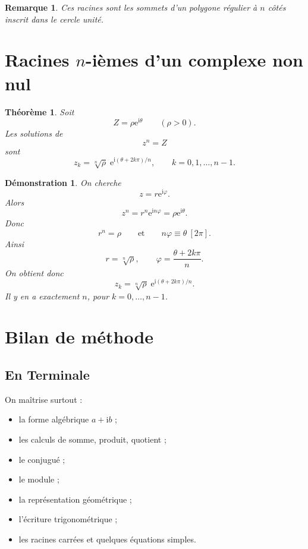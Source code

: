 \documentclass[11pt,a4paper]{article}
\newtheorem{theoreme}[definition]{Théorème}
\newtheorem{remarque}[definition]{Remarque}
\newtheorem*{demonstration}{Démonstration}
\newcommand{\ii}{\mathrm{i}}
\newcommand{\e}{\mathrm{e}}
\begin{document}
\begin{remarque}
Ces racines sont les sommets d'un polygone régulier à $n$ côtés inscrit dans le cercle unité.
\end{remarque}

\section{Racines $n$-ièmes d'un complexe non nul}

\begin{theoreme}
Soit
\[
Z=\rho \e^{\ii\theta}
\qquad (\rho>0).
\]
Les solutions de
\[
z^n=Z
\]
sont
\[
z_k=\sqrt[n]{\rho}\;\e^{\ii(\theta+2k\pi)/n},
\qquad k=0,1,\dots,n-1.
\]
\end{theoreme}

\begin{demonstration}
On cherche
\[
z=r\e^{\ii\varphi}.
\]
Alors
\[
z^n=r^n\e^{\ii n\varphi}=\rho \e^{\ii\theta}.
\]
Donc
\[
r^n=\rho
\qquad \text{et} \qquad
n\varphi\equiv \theta \ [2\pi].
\]
Ainsi
\[
r=\sqrt[n]{\rho},
\qquad
\varphi=\frac{\theta+2k\pi}{n}.
\]
On obtient donc
\[
z_k=\sqrt[n]{\rho}\;\e^{\ii(\theta+2k\pi)/n}.
\]
Il y en a exactement $n$, pour $k=0,\dots,n-1$.
\end{demonstration}

\section{Bilan de méthode}

\subsection*{En Terminale}
On maîtrise surtout :
\begin{itemize}[leftmargin=1.2cm]
    \item la forme algébrique $a+\ii b$ ;
    \item les calculs de somme, produit, quotient ;
    \item le conjugué ;
    \item le module ;
    \item la représentation géométrique ;
    \item l'écriture trigonométrique ;
    \item les racines carrées et quelques équations simples.
\end{itemize}
\end{document}
